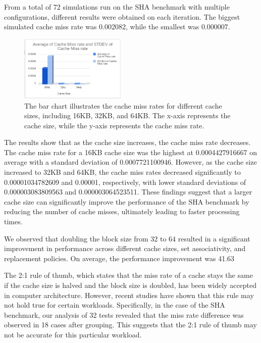 \documentclass[conference]{IEEEtran}
\begin{document}
From a total of 72 simulations run on the SHA benchmark with multiple configurations, different results were obtained on each iteration. The biggest simulated cache miss rate was 0.002082, while the smallest was 0.000007.

\begin{figure}[H]
    \centering
    \includegraphics[width=0.45\textwidth]{sha/sha_avg_cachesize.png}
    \caption{The bar chart illustrates the cache miss rates for different cache sizes, including 16KB, 32KB, and 64KB. The x-axis represents the cache size, while the y-axis represents the cache miss rate.}
\end{figure}

The results show that as the cache size increases, the cache miss rate decreases. The cache miss rate for a 16KB cache size was the highest at 0.0004427916667 on average with a standard deviation of 0.0007721100946. However, as the cache size increased to 32KB and 64KB, the cache miss rates decreased significantly to 0.00001034782609 and 0.00001, respectively, with lower standard deviations of 0.000003083809563 and 0.000003064523511. These findings suggest that a larger cache size can significantly improve the performance of the SHA benchmark by reducing the number of cache misses, ultimately leading to faster processing times.

We observed that doubling the block size from 32 to 64 resulted in a significant improvement in performance across different cache sizes, set associativity, and replacement policies. On average, the performance improvement was 41.63%

The 2:1 rule of thumb, which states that the miss rate of a cache stays the same if the cache size is halved and the block size is doubled, has been widely accepted in computer architecture. However, recent studies have shown that this rule may not hold true for certain workloads. Specifically, in the case of the SHA benchmark, our analysis of 32 tests revealed that the miss rate difference was observed in 18 cases after grouping. This suggests that the 2:1 rule of thumb may not be accurate for this particular workload.
\end{document}
